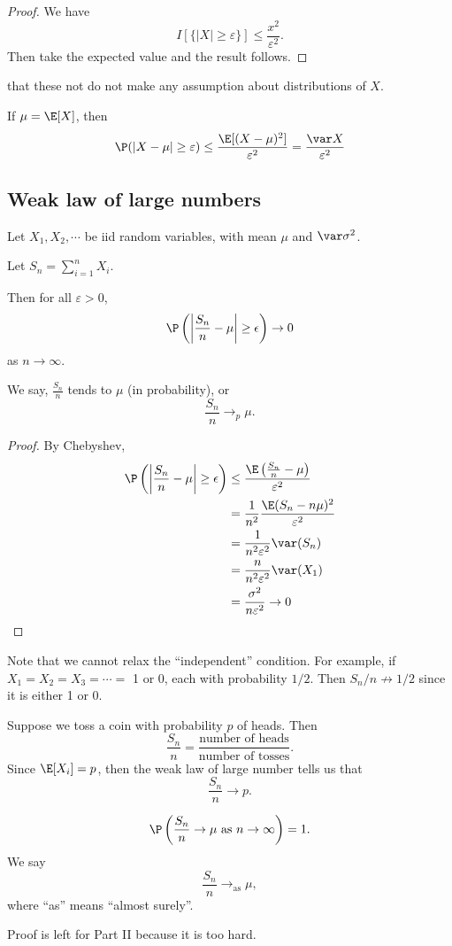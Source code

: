 \documentclass[a4paper]{article}
\begin{document}
\begin{proof}
  We have
  \[
    I[\{|X|\geq \varepsilon\}] \leq \frac{x^2}{\varepsilon^2}.
  \]
  Then take the expected value and the result follows.
\end{proof}
\note that these not do not make any assumption about distributions of $X$.

\note If $\mu = \E[X]$, then
\[
  \P(|X - \mu| \geq \varepsilon) \leq \frac{\E[(X - \mu)^2]}{\varepsilon^2} = \frac{\var X}{\varepsilon^2}
\]

\subsection{Weak law of large numbers}
\begin{thm}
  Let $X_1, X_2, \cdots$ be iid random variables, with mean $\mu$ and $\var \sigma^2$.
  
  Let $S_n = \sum_{i = 1}^n X_i$.

  Then for all $\varepsilon > 0$,
  \[
    \P\left(\left|\frac{S_n}{n} - \mu\right| \geq \epsilon\right) \to 0
  \]
  as $n\to \infty$.

  We say, $\frac{S_n}{n}$ tends to $\mu$ (in probability), or
  \[
    \frac{S_n}{n}\to_p \mu.
  \]
\end{thm}

\begin{proof}
  By Chebyshev,
  \begin{align*}
    \P\left(\left|\frac{S_n}{n} - \mu\right| \geq \epsilon\right)&\leq \frac{\E\left(\frac{S_n}{n} - \mu\right)}{\varepsilon^2}\\
    &= \frac{1}{n^2}\frac{\E(S_n -n\mu)^2}{\varepsilon^2}\\
    &= \frac{1}{n^2\varepsilon^2}\var (S_n)\\
    &= \frac{n}{n^2\varepsilon^2}\var (X_1)\\
    &= \frac{\sigma^2}{n\varepsilon^2} \to 0
  \end{align*}
\end{proof}

Note that we cannot relax the ``independent'' condition. For example, if $X_1 = X_2 = X_3 = \cdots = $ 1 or 0, each with probability $1/2$. Then $S_n/n \not\to 1/2$ since it is either 1 or 0.

\begin{eg}
  Suppose we toss a coin with probability $p$ of heads. Then
  \[
    \frac{S_n}{n} = \frac{\text{number of heads}}{\text{number of tosses}}.
  \]
  Since $\E[X_i] = p$, then the weak law of large number tells us that
  \[
    \frac{S_n}{n} \to p.
  \]
\end{eg}

\begin{thm}
  \[
    \P\left(\frac{S_n}{n}\to \mu\text{ as }n\to \infty\right) = 1.
  \]
  We say
  \[
    \frac{S_n}{n}\to_{\mathrm{as}} \mu,
  \]
  where ``as'' means ``almost surely''.
\end{thm}
Proof is left for Part II because it is too hard.
\end{document}
